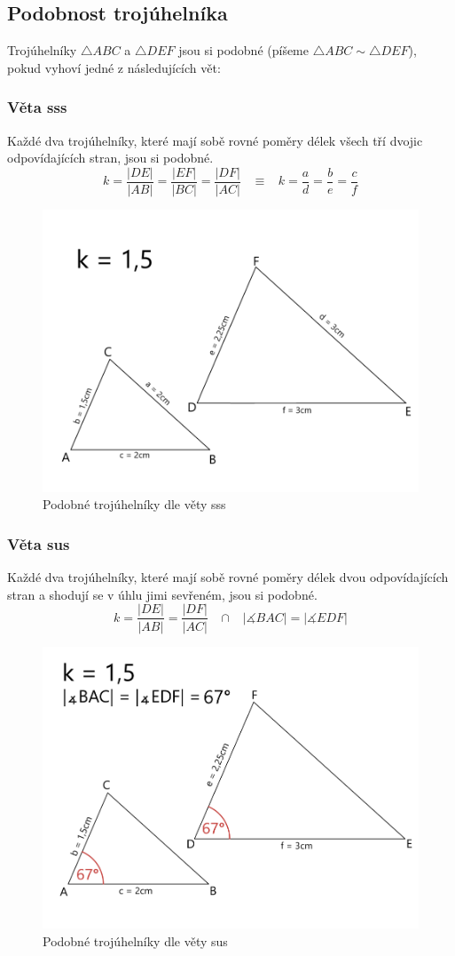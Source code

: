     \subsection{Podobnost trojúhelníka}
        Trojúhelníky $\bigtriangleup ABC$ a $\bigtriangleup DEF$ jsou si podobné (píšeme $\bigtriangleup ABC \sim \bigtriangleup DEF$), pokud vyhoví jedné z následujících vět:
        \subsubsection{Věta sss}
            Každé dva trojúhelníky, které mají sobě rovné poměry délek všech tří dvojic odpovídajících stran, jsou si podobné.\\
            \[k=\frac{\left| DE \right|}{\left| AB \right|}=\frac{\left| EF \right|}{\left| BC \right|}=\frac{\left| DF \right|}{\left| AC \right|} \;\;\; \equiv \;\;\; k=\frac{a}{d}=\frac{b}{e}=\frac{c}{f}\]

            \begin{figure}[H]
                \centering
                \includegraphics[width=0.5\linewidth]{img/23_trojuhelniky_sss.png}
                \caption{Podobné trojúhelníky dle věty sss} 
                \label{fig:enter-label}
            \end{figure}
            
        \subsubsection{Věta sus}
            Každé dva trojúhelníky, které mají sobě rovné poměry délek dvou odpovídajících stran a shodují se v úhlu jimi sevřeném, jsou si podobné.
            \[k=\frac{\left| DE \right|}{\left| AB \right|}=\frac{\left| DF \right|}{\left| AC \right|} \;\;\; \cap \;\;\; \left| \measuredangle BAC\right| = \left| \measuredangle EDF \right|\]

            \begin{figure}[H]
                \centering
                \includegraphics[width=0.5\linewidth]{img/23_trojuhelniky_sus.png}
                \caption{Podobné trojúhelníky dle věty sus} 
                \label{fig:enter-label}
            \end{figure}
            
